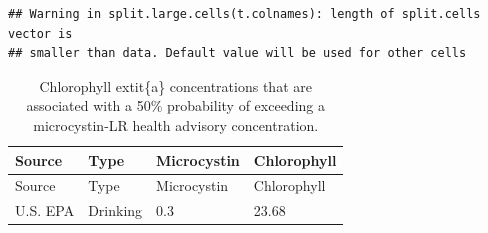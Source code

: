 \documentclass[11pt,]{article}
\begin{document}
\begin{verbatim}
## Warning in split.large.cells(t.colnames): length of split.cells vector is
## smaller than data. Default value will be used for other cells
\end{verbatim}

\begin{longtable}[c]{@{}llll@{}}
\caption{Chlorophyll extit\{a\} concentrations that are associated with
a 50\% probability of exceeding a microcystin-LR health advisory
concentration. \label{tab:mc_chla_table}}\tabularnewline
\toprule
\begin{minipage}[b]{0.11\columnwidth}\raggedright\strut
Source
\strut\end{minipage} &
\begin{minipage}[b]{0.16\columnwidth}\raggedright\strut
Type
\strut\end{minipage} &
\begin{minipage}[b]{0.17\columnwidth}\raggedright\strut
Microcystin
\strut\end{minipage} &
\begin{minipage}[b]{0.17\columnwidth}\raggedright\strut
Chlorophyll
\strut\end{minipage}\tabularnewline
\midrule
\endfirsthead
\toprule
\begin{minipage}[b]{0.11\columnwidth}\raggedright\strut
Source
\strut\end{minipage} &
\begin{minipage}[b]{0.16\columnwidth}\raggedright\strut
Type
\strut\end{minipage} &
\begin{minipage}[b]{0.17\columnwidth}\raggedright\strut
Microcystin
\strut\end{minipage} &
\begin{minipage}[b]{0.17\columnwidth}\raggedright\strut
Chlorophyll
\strut\end{minipage}\tabularnewline
\midrule
\endhead
\begin{minipage}[t]{0.11\columnwidth}\raggedright\strut
U.S. EPA
\strut\end{minipage} &
\begin{minipage}[t]{0.16\columnwidth}\raggedright\strut
Drinking
\strut\end{minipage} &
\begin{minipage}[t]{0.17\columnwidth}\raggedright\strut
0.3
\strut\end{minipage} &
\begin{minipage}[t]{0.17\columnwidth}\raggedright\strut
23.68
\strut\end{minipage}\tabularnewline

\end{longtable}
\end{document}
